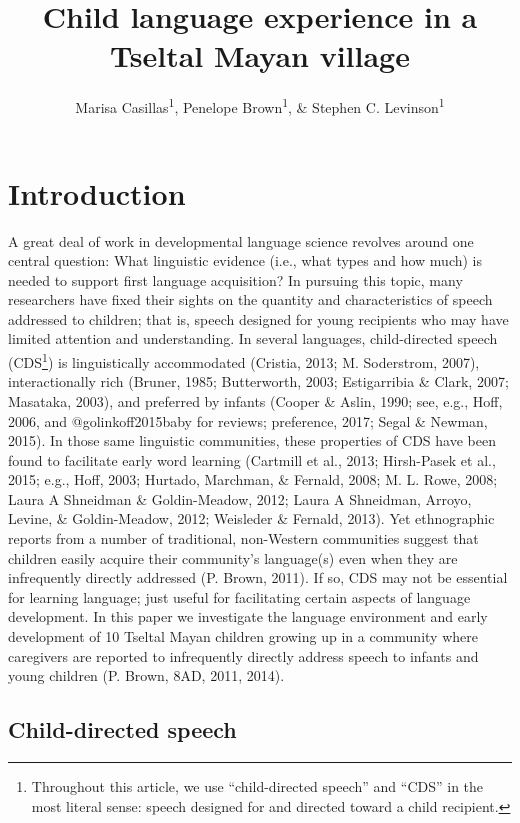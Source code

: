 \documentclass[floatsintext,man]{apa6}
\title{Child language experience in a Tseltal Mayan village}
\author{Marisa Casillas\textsuperscript{1}, Penelope Brown\textsuperscript{1}, \& Stephen C. Levinson\textsuperscript{1}}
\affiliation{
    \vspace{0.5cm}
          \textsuperscript{1} Max Planck Institute for Psycholinguistics  }
\theoremstyle{definition}
\theoremstyle{definition}
\theoremstyle{definition}
\theoremstyle{remark}
\begin{document}
\maketitle

\setcounter{secnumdepth}{0}



\section{Introduction}\label{intro}

A great deal of work in developmental language science revolves around
one central question: What linguistic evidence (i.e., what types and how
much) is needed to support first language acquisition? In pursuing this
topic, many researchers have fixed their sights on the quantity and
characteristics of speech addressed to children; that is, speech
designed for young recipients who may have limited attention and
understanding. In several languages, child-directed speech
(CDS\footnote{Throughout this article, we use \enquote{child-directed
  speech} and \enquote{CDS} in the most literal sense: speech designed
  for and directed toward a child recipient.}) is linguistically
accommodated (Cristia, 2013; M. Soderstrom, 2007), interactionally rich
(Bruner, 1985; Butterworth, 2003; Estigarribia \& Clark, 2007; Masataka,
2003), and preferred by infants (Cooper \& Aslin, 1990; see, e.g., Hoff,
2006, and @golinkoff2015baby for reviews; preference, 2017; Segal \&
Newman, 2015). In those same linguistic communities, these properties of
CDS have been found to facilitate early word learning (Cartmill et al.,
2013; Hirsh-Pasek et al., 2015; e.g., Hoff, 2003; Hurtado, Marchman, \&
Fernald, 2008; M. L. Rowe, 2008; Laura A Shneidman \& Goldin-Meadow,
2012; Laura A Shneidman, Arroyo, Levine, \& Goldin-Meadow, 2012;
Weisleder \& Fernald, 2013). Yet ethnographic reports from a number of
traditional, non-Western communities suggest that children easily
acquire their community's language(s) even when they are infrequently
directly addressed (P. Brown, 2011). If so, CDS may not be essential for
learning language; just useful for facilitating certain aspects of
language development. In this paper we investigate the language
environment and early development of 10 Tseltal Mayan children growing
up in a community where caregivers are reported to infrequently directly
address speech to infants and young children (P. Brown, 8AD, 2011,
2014).

\subsection{Child-directed speech}\label{intro-cds}
\end{document}
